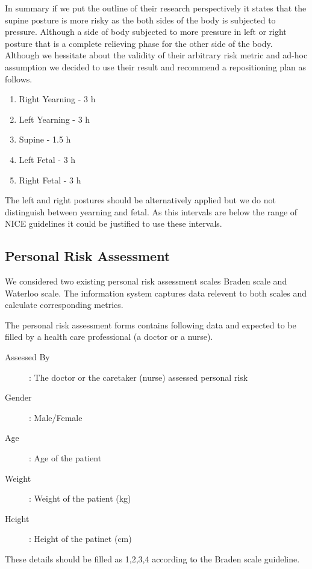 In summary if we put the outline of their research perspectively it states that the supine posture is more risky as the both sides of the body is subjected to pressure. Although a side of body subjected to more pressure in left or right posture that is a complete relieving phase for the other side of the body. Although we hessitate about the validity of their arbitrary risk metric and ad-hoc assumption we decided to use their result and recommend a repositioning plan as follows. 

\begin{enumerate}
	\item Right Yearning - 3 h
	\item Left Yearning - 3 h
	\item Supine - 1.5 h
	\item Left Fetal - 3 h
	\item Right Fetal - 3 h
\end{enumerate}

The left and right postures should be alternatively applied but we do not distinguish between yearning and fetal. As this intervals are below the range of NICE guidelines it could be justified to use these intervals. 

\subsection{Personal Risk Assessment}

We considered two existing personal risk assessment scales Braden scale and Waterloo scale. The information system captures data relevent to both scales and calculate corresponding metrics. 

The personal risk assessment forms contains following data and expected to be filled by a health care professional (a doctor or a nurse). 

\begin{description}
	\item[Assessed By]: The doctor or the caretaker (nurse) assessed personal risk
	\item[Gender]: Male/Female
	\item[Age]: Age of the patient
	\item[Weight]: Weight of the patient (kg)
	\item[Height]: Height of the patinet (cm)    
\end{description}

These details should be filled as 1,2,3,4 according to the Braden scale guideline. 

